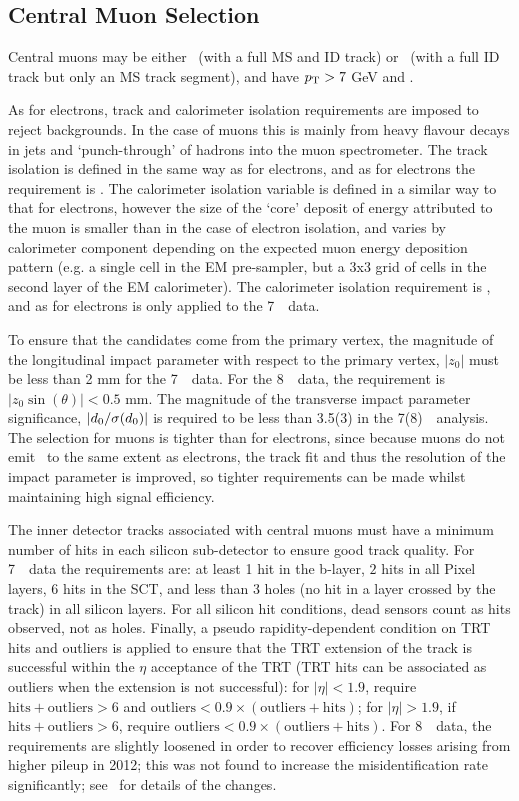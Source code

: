 \subsection{Central Muon Selection}

Central muons may be either \combined\ (with a full MS and ID track) or
\segmentTagged\ (with a full ID track but only an MS track segment), and have $p_{\mathrm{T}}>7$ GeV
and .

As for electrons, track and calorimeter isolation requirements are imposed to
reject backgrounds. In the case of muons this is mainly from heavy flavour
decays in jets and `punch-through' of hadrons into the muon spectrometer.  The
track isolation is defined in the same way as for electrons, and as for
electrons the requirement
is .  The calorimeter isolation variable is defined in a
similar way to that for electrons, however the size of the `core' deposit of energy
attributed to the muon is smaller than in the case of electron isolation, and
varies by calorimeter component depending on the expected muon energy deposition
pattern (e.g. a single cell in the EM pre-sampler, but a 3x3 grid of cells in the second
layer of the EM calorimeter). The calorimeter isolation requirement is
, and as for electrons is only applied to the 7~\tev\ data.

To ensure that the candidates come from the primary vertex, the magnitude of the
longitudinal impact parameter with respect to the primary vertex, $|z_0|$ must
be less than 2 mm for the 7~\tev\ data. For the 8~\tev\ data, the requirement is
$|z_0\sin(\theta)|<0.5$ mm. The magnitude of the transverse impact parameter
significance, $|d_{0} / \sigma (d_{0} )|$ is required to be less than 3.5(3) in the 7(8)~\tev\
analysis. The selection for muons is tighter than for electrons, since because
muons do not emit \brem\ to the same extent as electrons, the track fit and thus
the resolution of the impact parameter is improved, so tighter requirements can
be made whilst maintaining high signal efficiency.

The inner detector tracks associated with central muons must have a minimum
number of hits in each silicon sub-detector to ensure good track quality. For
7~\tev\ data the requirements are: at least 1 hit in the b-layer, $2$ hits in all Pixel
layers, $6$ hits in the SCT, and less than 3 holes (no hit in a layer crossed by the
track) in all silicon layers. For all silicon hit conditions, dead sensors count
as hits observed, not as holes.  Finally, a pseudo rapidity-dependent condition
on TRT hits and outliers is applied to ensure that the TRT extension of the
track is successful within the $\eta$ acceptance of the TRT (TRT hits can be
associated as outliers when the extension is not successful): for $|\eta| <
1.9$, require $\mathrm{hits}+\mathrm{outliers} > 6$ and $\mathrm{outliers} < 0.9
\times (\mathrm{outliers}+\mathrm{hits})$; for $|\eta| > 1.9$, if
$\mathrm{hits}+\mathrm{outliers} > 6$, require $\mathrm{outliers} < 0.9 \times
(\mathrm{outliers}+\mathrm{hits})$. For 8~\tev\ data, the
requirements are slightly loosened in order to recover efficiency losses arising
from higher pileup in 2012; this was not found to increase the misidentification rate significantly;
see~\tab{objsel-mu} for details of the changes.

